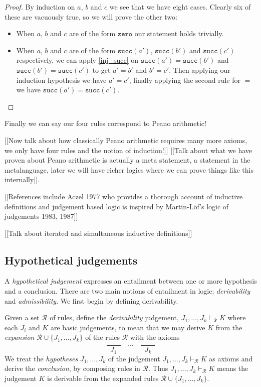 \begin{proof}
    By induction on $a$, $b$ and $c$ we see that we have eight cases. Clearly six of these are vacuously true, so we will prove the other two:
    \begin{itemize}
        \item When $a$, $b$ and $c$ are of the form $\texttt{zero}$ our statement holds trivially.
        \item When $a$, $b$ and $c$ are of the form $\texttt{succ}(a')$, $\texttt{succ}(b')$ and $\texttt{succ}(c')$ respectively, we can apply \ref{inj_succ} on $\texttt{succ}(a') =\texttt{succ}(b')$ and $\texttt{succ}(b') = \texttt{succ}(c')$ to get $a' = b'$ and $b' = c'$. Then applying our induction hypothesis we have $a' = c'$, finally applying the second rule for $=$ we have $\texttt{succ}(a') =\texttt{succ}(c')$.
    \end{itemize}
\end{proof}

Finally we can say our four rules correspond to Peano arithmetic!

[[Now talk about how classically Peano arithmetic requires many more axioms, we only have four rules and the notion of induction!]]
[[Talk about what we have proven about Peano arithmetic is actually a meta statement, a statement in the metalanguage, later we will have richer logics where we can prove things like this internally]].

[[References include Aczel 1977 who provides a thorough account of inductive definitions and judgement based logic is inspired by Martin-L\"of's logic of judgements 1983, 1987]]

[[Talk about iterated and simultaneous inductive definitions]]

\subsection{Hypothetical judgements}

A \emph{hypothetical judgement} expresses an entailment between one or more hypothesis and a conclusion. There are two main notions of entailment in logic: \emph{derivability} and \emph{admissibility}. We first begin by defining derivability.

\begin{defin}
    Given a set $\mathcal{R}$ of rules, define the \emph{derivability} judgement, $J_1,\dots,J_k \vdash_{\mathcal{R}} K$ where each $J_i$ and $K$ are basic judgements, to mean that we may derive $K$ from the \emph{expansion} $\mathcal{R} \cup \{ J_1, \dots, J_k \}$ of the rules $\mathcal{R}$ with the axioms
    $$
        \frac{\qquad}{J_1} \quad \cdots \quad \frac{\qquad}{J_k}
    $$
    We treat the \emph{hypotheses} $J_1, \dots, J_k$ of the judgement $J_1,\dots,J_k \vdash_{\mathcal{R}} K$ as axioms and derive the \emph{conclusion}, by composing rules in $\mathcal{R}$. Thus $J_1,\dots,J_k \vdash_{\mathcal{R}} K$ means the judgement $K$ is derivable from the expanded rules $\mathcal{R} \cup \{ J_1, \dots, J_k \}$.
\end{defin}

